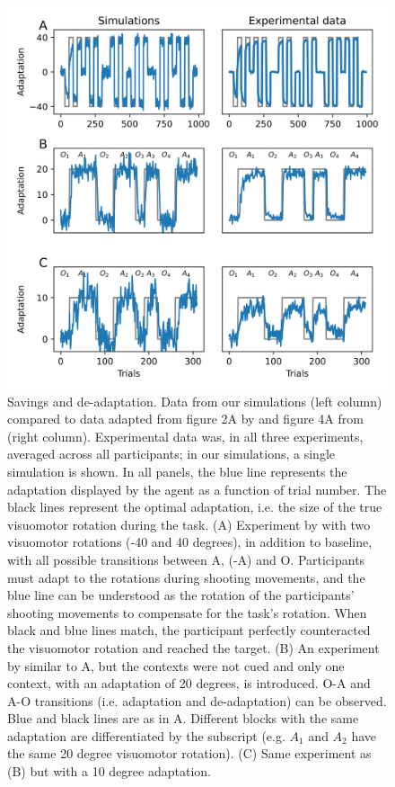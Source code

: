\documentclass[a4paper,doc,floatsintext,natbib]{apa6}
\begin{document}
\begin{figure}
\centering
\includegraphics{./figures/figure_2.png}
\caption{Savings and de-adaptation. Data from our simulations (left column) compared to data adapted from figure 2A by \cite{Kim_Neural_2015} and figure 4A from \cite{Oh_Minimizing_2019} (right column). Experimental data was, in all three experiments, averaged across all participants; in our simulations, a single simulation is shown. In all panels, the blue line represents the adaptation displayed by the agent as a function of trial number. The black lines represent the optimal adaptation, i.e. the size of the true visuomotor rotation during the task. (A) Experiment by \cite{Kim_Neural_2015} with two visuomotor rotations (-40 and 40 degrees), in addition to baseline, with all possible transitions between A, (-A) and O. Participants must adapt to the rotations during shooting movements, and the blue line can be understood as the rotation of the participants' shooting movements to compensate for the task's rotation. When black and blue lines match, the participant perfectly counteracted the visuomotor rotation and reached the target. (B) An experiment by \cite{Oh_Minimizing_2019} similar to A, but the contexts were not cued and only one context, with an adaptation of 20 degrees, is introduced. O-A and A-O transitions (i.e. adaptation and de-adaptation) can be observed. Blue and black lines are as in A. Different blocks with the same adaptation are differentiated by the subscript (e.g. $A_1$ and $A_2$ have the same 20 degree visuomotor rotation). (C) Same experiment as (B) but with a 10 degree adaptation.} \label{fig:oh-2019}
\end{figure}
\end{document}
